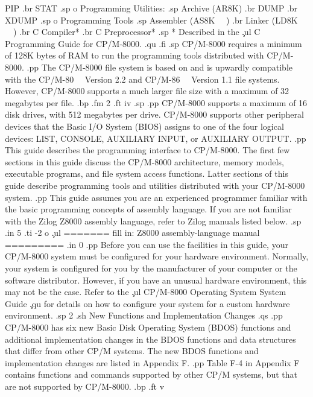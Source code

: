         PIP
.br
        STAT
.sp
   o  Programming Utilities:
.sp
        Archive (AR8K)
.br
        DUMP
.br
        XDUMP
.sp
   o  Programming Tools 
.sp
        Assembler (AS8K \ \ )
.br
        Linker    (LD8K \ \ )
.br
        C Compiler*
.br
        C Preprocessor*
.sp
   * Described in the \c
.ul
C Programming Guide for CP/M-8000.
.qu
.fi
.sp
CP/M-8000 requires a minimum of 128K bytes of RAM 
to run the programming tools distributed with CP/M-8000.
.pp
The CP/M-8000 file system is based on and is upwardly compatible
with the CP/M-80 \ \ Version 2.2 and CP/M-86 \ \ Version 1.1 file
systems.  However, CP/M-8000 supports a much larger file size
with a maximum of 32 megabytes per file. 
.bp
.fm 2
.ft                              iv
.sp 
.pp
CP/M-8000 supports a maximum of 16 disk
drives, with 512 megabytes per drive.  CP/M-8000 supports other
peripheral devices that the Basic I/O System
(BIOS) assigns to one of the four logical devices: LIST, CONSOLE,
AUXILIARY INPUT, or AUXILIARY OUTPUT. 
.pp
This guide describes the programming interface to CP/M-8000.  The first few
sections in this guide discuss the CP/M-8000 architecture, memory models,
executable programs, and file system access functions.  Latter sections of
this guide describe programming tools and utilities distributed with your
CP/M-8000 system. 
.pp
This guide assumes you are an experienced programmer familiar
with the basic programming concepts of assembly language.
If you are not familiar with the Zilog Z8000 assembly language,
refer to Zilog manuals listed below.
.sp
.in 5
.ti -2
o \c
.ul
======= fill in:  Z8000 assembly-language manual =========
.in 0
.pp
Before you can use the facilities in this guide, your CP/M-8000
system must be configured for your hardware environment.
Normally, your system is configured for you by the manufacturer
of your computer or the software distributor.  However, if you
have an unusual hardware environment, this may not be the case.
Refer to the \c
.ul
CP/M-8000 Operating System System Guide \c
.qu
for details on how to configure your system for a custom hardware
environment. 
.sp 2
.sh
New Functions and Implementation Changes 
.qs
.pp 
CP/M-8000 has six new Basic Disk Operating System (BDOS) functions
and additional implementation changes in the BDOS functions and
data structures that differ from other CP/M systems.  
The new BDOS functions and implementation changes are listed 
in Appendix F.
.pp
Table F-4 in Appendix F contains functions and commands supported by other CP/M
systems, but that are not supported by CP/M-8000.
.bp
.ft                                  v
